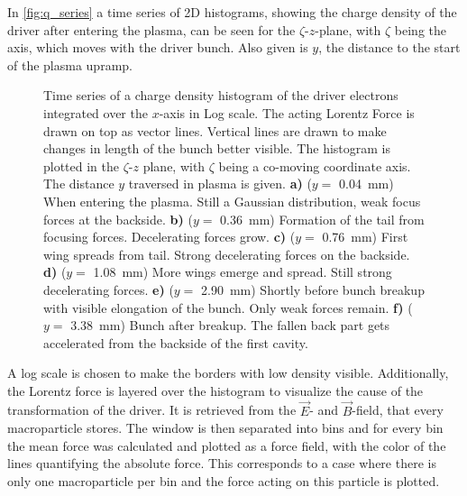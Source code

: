 \documentclass[bachelor_thesis]{subfiles}
\begin{document}
In \autoref{fig:q_series} a time series of 2D histograms, showing the charge density of the driver after entering the plasma, can be seen for the $\zeta$-$z$-plane, with $\zeta$ being the axis, which moves with the driver bunch. Also given is $y$, the distance to the start of the plasma upramp.
\begin{figure}
	\centering
	
	\caption{Time series of a charge density histogram of the driver electrons integrated over the $x$-axis in Log scale. The acting Lorentz Force is drawn on top as vector lines. Vertical lines are drawn to make changes in length of the bunch better visible. 
	The histogram is plotted in the $\zeta$-$z$ plane, with $\zeta$ being a co-moving coordinate axis. The distance $y$ traversed in plasma is given.
	\textbf{a)} ($y=$ \qty{0.04}{mm}) When entering the plasma. Still a Gaussian distribution, weak focus forces at the backside.
	\textbf{b)} ($y=$ \qty{0.36}{mm}) Formation of the tail from focusing forces. Decelerating forces grow.
	\textbf{c)} ($y=$ \qty{0.76}{mm}) First wing spreads from tail. Strong decelerating forces on the backside.
	\textbf{d)} ($y=$ \qty{1.08}{mm}) More wings emerge and spread. Still strong decelerating forces.
	\textbf{e)} ($y=$ \qty{2.90}{mm}) Shortly before bunch breakup with visible elongation of the bunch. Only weak forces remain.
	\textbf{f)} ($y=$ \qty{3.38}{mm}) Bunch after breakup. The fallen back part gets accelerated from the backside of the first cavity.}
	\label{fig:q_series}
\end{figure}

A log scale is chosen to make the borders with low density visible. Additionally, the Lorentz force is layered over the histogram to visualize the cause of the transformation of the driver. It is retrieved from the $\vec{E}$- and $\vec{B}$-field, that every macroparticle stores.
The window is then separated into bins and for every bin the mean force was calculated and plotted as a force field, with the color of the lines quantifying the absolute force. 
This corresponds to a case where there is only one macroparticle per bin and the force acting on this particle is plotted.
\end{document}
